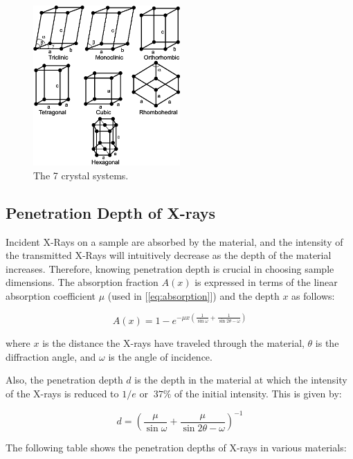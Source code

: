 \documentclass{article}
\begin{document}
\begin{figure}[h]
	\centering
	\includegraphics[width=0.5\textwidth]{Figures/UnitCells.png}
	\caption{The 7 crystal systems. \cite{shirokanev_2019_the}}
	\label{fig:crystalsystems}
\end{figure}

\subsection{Penetration Depth of X-rays}

Incident X-Rays on a sample are absorbed by the material, and the intensity of the transmitted X-Rays will intuitively decrease as the depth of the material increases. 
Therefore, knowing penetration depth is crucial in choosing sample dimensions. The absorption fraction $A(x)$ is expressed in terms of the linear absorption coefficient $\mu$ (used in [\ref{eq:absorption}]) and the depth $x$ as follows:

\begin{equation}
	A(x) = 1 - e^{-\mu x \left( \frac{1}{\sin\omega} + \frac{1}{\sin 2\theta - \omega} \right)}
\end{equation}

where $x$ is the distance the X-rays have traveled through the material, $\theta$ is the diffraction angle, and $\omega$ is the angle of incidence.

Also, the penetration depth $d$ is the depth in the material at which the intensity of the X-rays is reduced to $1/e$ or $~ 37\%$ of the initial intensity. This is given by:

\begin{equation}
	d = \left(\frac{\mu}{\sin\omega} + \frac{\mu}{\sin 2\theta - \omega}\right)^{-1}
\end{equation}

The following table shows the penetration depths of X-rays in various materials:
\end{document}
